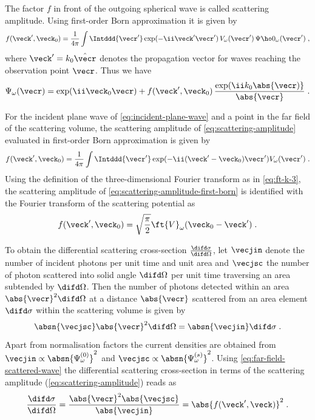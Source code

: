 \documentclass[
twoside,
openright,
titlepage,
numbers=noenddot,
headinclude,
fleqn,
a4paper,
footinclude=true,
cleardoublepage=empty,
abstractoff,
BCOR=5mm,
paper=a4,
fontsize=11pt,
british,ngerman,american,
]{scrreprt}
\begin{document}
The factor $f$ in front of the outgoing spherical wave is called
scattering amplitude.  Using first-order Born approximation it is
given by
\begin{equation}
  \label{eq:scattering-amplitude}
  f(\veck',\veck_0) = \frac{1}{4\pi}\int\Intddd{\vecr'}
  \exp(-\ii\veck'\vecr')\,V_\omega(\vecr')\,\Psi\ho0_\omega(\vecr') \;,
\end{equation}
where $\veck'=k_0\hat{\vecr}$ denotes the propagation
vector for waves reaching the observation point $\vecr$.  Thus we have
\begin{equation}
  \label{eq:far-field-scattered-wave}
  \Psi_\omega(\vecr) = \exp(\ii \veck_0\vecr) +
  f(\veck',\veck_0)\, \frac{\exp(\ii k_0\abs{\vecr)}}{\abs{\vecr}} \;.
\end{equation}

For the incident plane wave of \cref{eq:incident-plane-wave} and a
point in the far field of the scattering volume, the scattering
amplitude of \cref{eq:scattering-amplitude} evaluated in first-order
Born approximation is given by
\begin{equation}
  \label{eq:scattering-amplitude-first-born}
    f(\veck',\veck_0) 
       = \frac{1}{4\pi}\int\Intddd{\vecr'}
    \exp(-\ii(\veck'-\veck_0)\vecr')V_\omega(\vecr') \;.
\end{equation}
Using the definition of the three-dimensional Fourier transform as in
\cref{eq:ft-k-3}, the scattering amplitude of
\cref{eq:scattering-amplitude-first-born} is identified with the
Fourier transform of the scattering potential as
\begin{equation}
  \label{eq:scattering-amplitude-first-born-ft}
    f(\veck',\veck_0) 
    = \sqrt{\frac{\pi}{2}} \ft{V}_\omega(\veck_0 - \veck') \;.
\end{equation}

To obtain the differential scattering cross-section
$\frac{\difd\sigma}{\difd\Omega}$, let $\vecjin$ denote the number of
incident photons per unit time and unit area and $\vecjsc$ the number
of photon scattered into solid angle $\difd\Omega$ per unit time
traversing an area subtended by $\difd\Omega$.  Then the number of
photons detected within an area $\abs{\vecr}^2\difd\Omega$ at a
distance $\abs{\vecr}$ scattered from an area element $\difd\sigma$
within the scattering volume is given by
\begin{equation}
  \label{eq:scattered-photons}
  \absn{\vecjsc}\abs{\vecr}^2\difd\Omega 
  = \absn{\vecjin}\difd\sigma \;.
\end{equation}
Apart from normalisation factors the current densities are obtained
from $\vecjin\propto\absn{\Psi^{(0)}_\omega}^2$ and
$\vecjsc\propto\absn{\Psi^{(s)}_\omega}^2$.  Using
\cref{eq:far-field-scattered-wave} the differential scattering
cross-section in terms of the scattering amplitude
(\cref{eq:scattering-amplitude}) reads as
\begin{equation}
  \label{eq:differential-scattering-cross-section}
  \frac{\difd\sigma}{\difd\Omega} 
  = \frac{\abs{\vecr}^2\abs{\vecjsc}}{\abs{\vecjin}} 
  = \abs{f(\veck',\veck)}^2 \;.
\end{equation}
\end{document}
